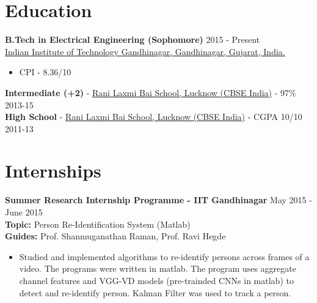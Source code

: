 \documentclass[margin, centered]{res}
\begin{document}
\begin{resume}

\section{Education}
\textbf{B.Tech in Electrical Engineering (Sophomore)} \hfill 2015 - Present
\\
\href{http://www.iitgn.ac.in/}{Indian Institute of Technology Gandhinagar, Gandhinagar, Gujarat, India.}
\begin{itemize}
\item CPI - 8.36/10
\end{itemize}
\textbf{Intermediate (+2)} - \href{http://www.rlbschools.org/}{Rani Laxmi Bai School, Lucknow (CBSE India)} - 97\% \hfill 2013-15
\\
\textbf{High School} - \href{http://www.rlbschools.org/}{Rani Laxmi Bai School, Lucknow (CBSE India)} - CGPA 10/10 \hfill 2011-13


\section{Internships}
\textbf{Summer Research Internship Programme - IIT Gandhinagar} \hfill May 2015 - June 2015
\\
{\bf Topic: }Person Re-Identification System (Matlab)
\\
{\bf Guides: }Prof. Shanmuganathan Raman, Prof. Ravi Hegde
\vspace{1mm}
\begin{itemize}
\item Studied and implemented algorithms to re-identify persons across frames of a video. The programs were written in matlab. The program uses aggregate channel features and VGG-VD models (pre-trainded CNNs in matlab) to detect and re-identify person. Kalman Filter was used to track a person.
\end{itemize}


\end{resume}
\end{document}
